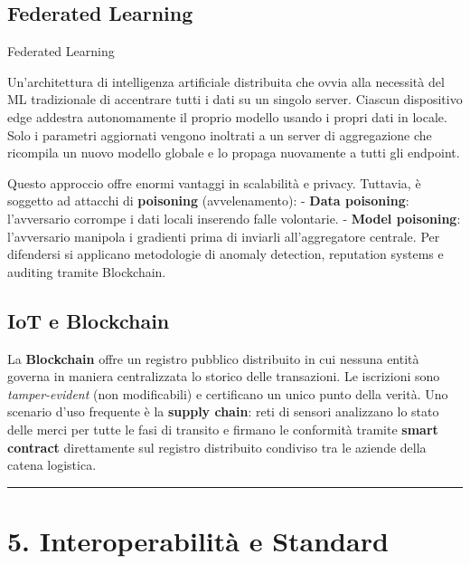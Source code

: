 \documentclass[
  italian,
  openany]{book}
\begin{document}
\subsection{Federated Learning}\label{federated-learning}

\begin{calloutdefinition}{Federated Learning}

Un'architettura di intelligenza artificiale distribuita che ovvia alla
necessità del ML tradizionale di accentrare tutti i dati su un singolo
server. Ciascun dispositivo edge addestra autonomamente il proprio
modello usando i propri dati in locale. Solo i parametri aggiornati
vengono inoltrati a un server di aggregazione che ricompila un nuovo
modello globale e lo propaga nuovamente a tutti gli endpoint.

\end{calloutdefinition}

Questo approccio offre enormi vantaggi in scalabilità e privacy.
Tuttavia, è soggetto ad attacchi di \textbf{poisoning} (avvelenamento):
- \textbf{Data poisoning}: l'avversario corrompe i dati locali inserendo
falle volontarie. - \textbf{Model poisoning}: l'avversario manipola i
gradienti prima di inviarli all'aggregatore centrale. Per difendersi si
applicano metodologie di anomaly detection, reputation systems e
auditing tramite Blockchain.

\subsection{IoT e Blockchain}\label{iot-e-blockchain}

La \textbf{Blockchain} offre un registro pubblico distribuito in cui
nessuna entità governa in maniera centralizzata lo storico delle
transazioni. Le iscrizioni sono \emph{tamper-evident} (non modificabili)
e certificano un unico punto della verità. Uno scenario d'uso frequente
è la \textbf{supply chain}: reti di sensori analizzano lo stato delle
merci per tutte le fasi di transito e firmano le conformità tramite
\textbf{smart contract} direttamente sul registro distribuito condiviso
tra le aziende della catena logistica.

\begin{center}\rule{0.5\linewidth}{0.5pt}\end{center}

\section{5. Interoperabilità e
Standard}\label{interoperabilituxe0-e-standard}
\end{document}
